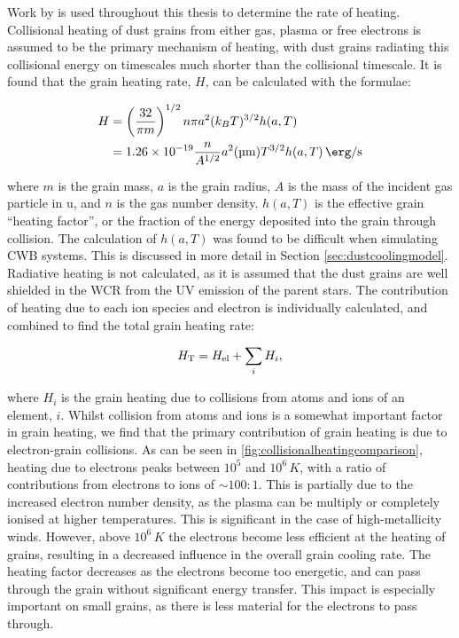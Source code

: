 Work by \textcite{dwek_infrared_1981} is used throughout this thesis to determine the rate of heating.
Collisional heating of dust grains from either gas, plasma or free electrons is assumed to be the primary mechanism of heating, with dust grains radiating this collisional energy on timescales much shorter than the collisional timescale.
It is found that the grain heating rate, $H$, can be calculated with the formulae:

\begin{equation}
  \label{eq:grainheatingrate}
  \begin{split}
    H & = \left(\frac{32}{\pi m}\right)^{1/2} n\pi a^2 (k_B T)^{3/2} h(a,T) \\
    & = \num{1.26e-19} \frac{n}{A^{1/2}} a^2 (\si{\micro\metre}) T^{3/2} h(a,T) \, \si{\erg\per\second}
  \end{split}
\end{equation}

\noindent
where $m$ is the grain mass, $a$ is the grain radius, $A$ is the mass of the incident gas particle in \si{\atomicmassunit}, and $n$ is the gas number density.
$h(a,T)$ is the effective grain ``heating factor'', or the fraction of the energy deposited into the grain through collision.
The calculation of $h(a,T)$ was found to be difficult when simulating CWB systems.
This is discussed in more detail in Section \ref{sec:dustcoolingmodel}.
Radiative heating is not calculated, as it is assumed that the dust grains are well shielded in the WCR from the UV emission of the parent stars.
The contribution of heating due to each ion species and electron is individually calculated, and combined to find the total grain heating rate:

\begin{equation}
  H_\text{T} = H_\text{el} + \sum_i H_i , 
\end{equation}

\noindent
where $H_i$ is the grain heating due to collisions from atoms and ions of an element, $i$.
Whilst collision from atoms and ions is a somewhat important factor in grain heating, we find that the primary contribution of grain heating is due to electron-grain collisions.
As can be seen in \ref{fig:collisionalheatingcomparison}, heating due to electrons peaks between $10^5$ and $10^6 \, \si{K}$, with a ratio of contributions from electrons to ions of $\sim 100 : 1$.
This is partially due to the increased electron number density, as the plasma can be multiply or completely ionised at higher temperatures.
This is significant in the case of high-metallicity winds.
However, above $10^6\,\si{K}$ the electrons become less efficient at the heating of grains, resulting in a decreased influence in the overall grain cooling rate.
The heating factor decreases as the electrons become too energetic, and can pass through the grain without significant energy transfer.
This impact is especially important on small grains, as there is less material for the electrons to pass through.

